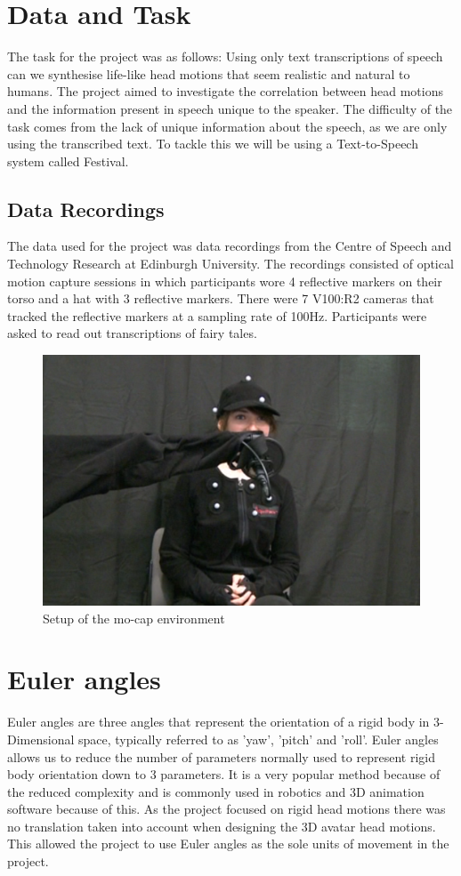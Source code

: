 \documentclass[bsc,frontabs,twoside,singlespacing,parskip]{infthesis}
\begin{document}
\section{Data and Task}

The task for the project was as follows: Using only text transcriptions of speech can we synthesise life-like head motions that seem realistic and natural to humans. The project aimed to investigate the correlation between head motions and the information present in speech unique to the speaker. The difficulty of the task comes from the lack of unique information about the speech, as we are only using the transcribed text. To tackle this we will be using a Text-to-Speech system called Festival.

\subsection{Data Recordings}

The data used for the project was data recordings from the Centre of Speech and Technology Research at Edinburgh University. The recordings consisted of optical motion capture sessions in which participants wore 4 reflective markers on their torso and a hat with 3 reflective markers. There were 7 V100:R2 cameras that tracked the reflective markers at a sampling rate of 100Hz. Participants were asked to read out transcriptions of fairy tales.

\begin{figure}[h!]
	\centering
	\includegraphics[width=.7\textwidth]{mocap.png}
	\caption{Setup of the mo-cap environment}
\end{figure}

\section{Euler angles}

Euler angles are three angles that represent the orientation of a rigid body in 3-Dimensional space, typically referred to as 'yaw', 'pitch' and 'roll'. Euler angles allows us to reduce the number of parameters normally used to represent rigid body orientation down to 3 parameters. It is a very popular method because of the reduced complexity and is commonly used in robotics and 3D animation software because of this. As the project focused on rigid head motions there was no translation taken into account when designing the 3D avatar head motions. This allowed the project to use Euler angles as the sole units of movement in the project.
\end{document}
